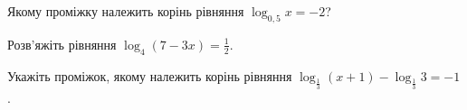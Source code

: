 \documentclass[12pt]{article}
\begin{document}
\begingroup\setcounter{zad}{0}
\providecommand{\trigStyle}[1]{#1}
\providecommand{\answerTableSmall}[5]{%
\begingroup\setlength{\tabcolsep}{2pt}\small\nmtSetCell
\begin{tabular}{|*{5}{>{\centering\arraybackslash}m{\nmtcellw}|}}
\hline
\rule[-0.2cm]{0pt}{0.6cm}\textbf{А} & \textbf{Б} & \textbf{В} & \textbf{Г} & \textbf{Д} \\
\hline
\rule[-0.4cm]{0pt}{0.9cm}#1 & \rule[-0.4cm]{0pt}{0.9cm}#2 & \rule[-0.4cm]{0pt}{0.9cm}#3 & \rule[-0.4cm]{0pt}{0.9cm}#4 & \rule[-0.4cm]{0pt}{0.9cm}#5 \\
\hline
\end{tabular}\endgroup}
\providecommand{\answerListVertical}[5]{\nmtOptions{#1}{#2}{#3}{#4}{#5}}

\par\vspace{0.2cm}


\begin{samepage}
\noindent\zadnum Якому проміжку належить корінь рівняння $\log_{0{,}5} x = -2$? \par
\nopagebreak\nbvspace{0.3cm}

\nmtnobreak
\answerTable{$(1; 4]$}{$(-1; 1]$}{$(8; +\infty)$}{$(-\infty; -1]$}{$(4; 8]$}
\par{}
\end{samepage}

\begin{samepage}
\noindent\zadnum Розв'яжіть рівняння $\log_4 (7 - 3x) = \displaystyle\frac{1}{2}$. \par
\nopagebreak\nbvspace{0.3cm}

\nmtnobreak
{}
\nopagebreak\nbvspace{0.5cm}

\nmtnobreak
\par{}\vspace{0.25cm}
\end{samepage}

\begin{samepage}
\noindent\zadnum Укажіть проміжок, якому належить корінь рівняння $\log_{\frac{1}{3}} (x + 1) - \log_{\frac{1}{3}} 3 = -1$. \par
\nopagebreak\nbvspace{0.3cm}

\nmtnobreak
\answerTable{$(7; 9]$}{$(9; +\infty)$}{$(0; 1]$}{$(-1; 0]$}{$(1; 7]$}
\par{}
\end{samepage}
\end{document}
